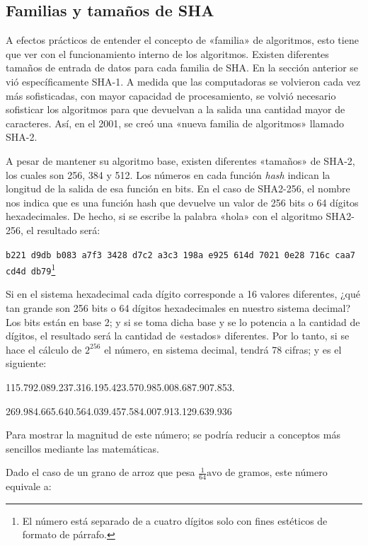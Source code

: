 \documentclass[12pt,a4paper,twoside]{book}
\begin{document}
\subsection{Familias y tamaños de SHA}
A efectos prácticos de entender el concepto de «familia» de algoritmos, esto tiene que ver con el funcionamiento interno de los algoritmos. Existen diferentes tamaños de entrada de datos para cada familia de SHA. En la sección anterior se vió específicamente SHA-1. A medida que las computadoras se volvieron cada vez más sofisticadas, con mayor capacidad de procesamiento, se volvió necesario sofisticar los algoritmos para que devuelvan a la salida una cantidad mayor de caracteres. Así, en el 2001, se creó una «nueva familia de algoritmos» llamado SHA-2.

A pesar de mantener su algoritmo base, existen diferentes «tamaños» de SHA-2, los cuales son 256, 384 y 512. Los números en cada función \textit{hash} indican la longitud de la salida de esa función en bits. En el caso de SHA2-256, el nombre nos indica que es una función hash que devuelve un valor de 256 bits o 64 dígitos hexadecimales. De hecho, si se escribe la palabra «hola» con el algoritmo SHA2-256, el resultado será:

\begin{center}
\texttt{b221 d9db b083 a7f3 3428 d7c2 a3c3 198a e925 614d 7021 0e28 716c caa7 cd4d db79}\footnote{El número está separado de a cuatro dígitos solo con fines estéticos de formato de párrafo.}
\end{center}

Si en el sistema hexadecimal cada dígito corresponde a 16 valores diferentes, ¿qué tan grande son 256 bits o 64 dígitos hexadecimales en nuestro sistema decimal? Los bits están en base 2; y si se toma dicha base y se lo potencia a la cantidad de dígitos, el resultado será la cantidad de «estados» diferentes. Por lo tanto, si se hace el cálculo de $ 2^{256} $ el número, en sistema decimal, tendrá 78 cifras; y es el siguiente:

\begin{center}
115.792.089.237.316.195.423.570.985.008.687.907.853.

269.984.665.640.564.039.457.584.007.913.129.639.936
\end{center}

Para mostrar la magnitud de este número; se podría reducir a conceptos más sencillos mediante las matemáticas. 

Dado el caso de un grano de arroz que pesa $ \frac{1}{64}\text{avo} $ de gramos, este número equivale a:
\end{document}
